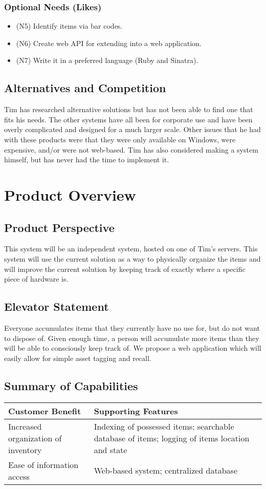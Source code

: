 \documentclass{article}
\begin{document}
\subsubsection{Optional Needs (Likes)}
\begin{itemize}
\item (N5) Identify items via bar codes.
\item (N6) Create web API for extending into a web application.
\item (N7) Write it in a preferred language (Ruby and Sinatra).
\end{itemize}


\subsection{Alternatives and Competition}
Tim has researched alternative solutions but has not been able to find one that fits his needs.  The other systems have all been for corporate use and have been overly complicated and designed for a much larger scale.  Other issues that he had with these products were that they were only available on Windows, were expensive, and/or were not web-based.  Tim has also considered making a system himself, but has never had the time to implement it.

\section{Product Overview}

\subsection{Product Perspective}
This system will be an independent system, hosted on one of Tim's servers.  This system will use the current solution as a way to physically organize the items and will improve the current solution by keeping track of exactly where a specific piece of hardware is.

\subsection{Elevator Statement}
Everyone accumulates items that they currently have no use for, but do not want to dispose of.  Given enough time, a person will accumulate more items than they will be able to consciously keep track of. We propose a web application which will easily allow for simple asset tagging and recall.

\subsection{Summary of Capabilities}
\begin{tabular}{ | p{2.5in} | p{3.5in} | }
\hline
\textbf{Customer Benefit} & \textbf{Supporting Features}\\
\hline
\hline
Increased organization of inventory & Indexing of possessed items; searchable database of items; logging of items location and state\\
\hline
Ease of information access & Web-based system; centralized database\\
\hline
\end{tabular}
\end{document}
